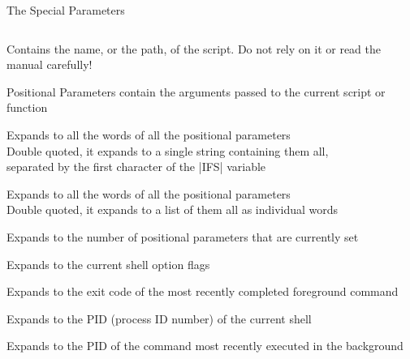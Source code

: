 
\begin{frame}{The Special Parameters}{}
    \vspace{-8mm}
    \begin{columns}
        \begin{column}{\dimexpr\paperwidth-10mm}
            \begin{description}
                \setlength{\itemsep}{2pt}
                \item[\texttt{0}]
                    Contains the name, or the path, of the script.
                    Do not rely on it or read the manual carefully!
                \item[\texttt{1 2 \ldots}]
                    \alert{Positional Parameters} contain the arguments passed
                    to the current script or function
                \item[\texttt{*}]
                    Expands to all the words of all the positional parameters\\
                    Double quoted, it expands to a single string containing them all,\\ separated by the first character of the \bash|IFS| variable
                \item[\texttt{@}]
                    Expands to all the words of all the positional parameters\\
                    Double quoted, it expands to a list of them all as individual words
                \item[\texttt{\#}]
                    Expands to the number of positional parameters that are currently set
                \item[\texttt{-}]
                    Expands to the current shell option flags
                \item[\texttt{?}]
                    Expands to the exit code of the most recently completed foreground command
                \item[\texttt{\$}]
                    Expands to the PID (process ID number) of the current shell
                \item[\texttt{!}]
                    Expands to the PID of the command most recently executed in the background

\end{description}
\end{column}
\end{columns}
\end{frame}
